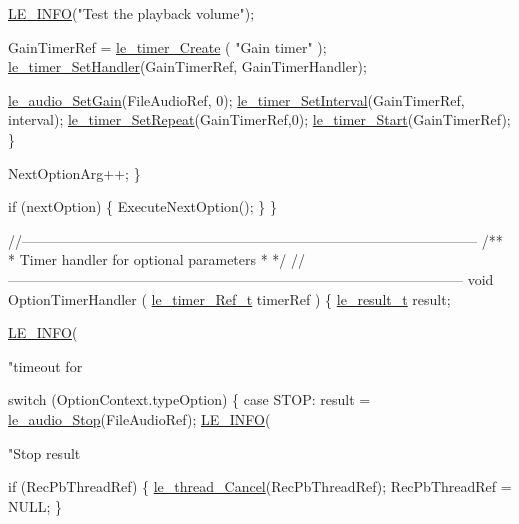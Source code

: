 \begin{DoxyCodeInclude}
{{{{{{{{{{{{{{{            \hyperlink{le__log_8h_a23e6d206faa64f612045d688cdde5808}{LE\_INFO}(\textcolor{stringliteral}{"Test the playback volume"});

            GainTimerRef = \hyperlink{le__timer_8h_aee41169a210378b369f440cf99146522}{le\_timer\_Create}  ( \textcolor{stringliteral}{"Gain timer"} );
            \hyperlink{le__timer_8h_a8fb341f11e0da2692453df997613cb8e}{le\_timer\_SetHandler}(GainTimerRef, GainTimerHandler);

            \hyperlink{le__audio__interface_8h_a65f11540e6af03a3494b6b9be76ba5fc}{le\_audio\_SetGain}(FileAudioRef, 0);
            \hyperlink{le__timer_8h_a0a103d5cef5e83fc9088859d527bbd43}{le\_timer\_SetInterval}(GainTimerRef, interval);
            \hyperlink{le__timer_8h_a292b0a7d6dc0796a36a54fd04c6a7eeb}{le\_timer\_SetRepeat}(GainTimerRef,0);
            \hyperlink{le__timer_8h_ada2ce7f8cb1e76ed959e323ae94bbfc0}{le\_timer\_Start}(GainTimerRef);
        \}

        NextOptionArg++;
    \}

    \textcolor{keywordflow}{if} (nextOption)
    \{
        ExecuteNextOption();
    \}
\}

\textcolor{comment}{//--------------------------------------------------------------------------------------------------}\textcolor{comment}{}
\textcolor{comment}{/**}
\textcolor{comment}{ * Timer handler for optional parameters}
\textcolor{comment}{ *}
\textcolor{comment}{ */}
\textcolor{comment}{//--------------------------------------------------------------------------------------------------}
\textcolor{keywordtype}{void} OptionTimerHandler
(
    \hyperlink{le__timer_8h_a763fa6992488cdce3b5a820817094838}{le\_timer\_Ref\_t} timerRef
)
\{
    \hyperlink{le__basics_8h_a1cca095ed6ebab24b57a636382a6c86c}{le\_result\_t} result;

    \hyperlink{le__log_8h_a23e6d206faa64f612045d688cdde5808}{LE\_INFO}(\textcolor{stringliteral}{"timeout for %

    \textcolor{keywordflow}{switch} (OptionContext.typeOption)
    \{
        \textcolor{keywordflow}{case} STOP:
            result = \hyperlink{le__audio__interface_8h_a4aebc6e8cdc4389c375e93418823af71}{le\_audio\_Stop}(FileAudioRef);
            \hyperlink{le__log_8h_a23e6d206faa64f612045d688cdde5808}{LE\_INFO}(\textcolor{stringliteral}{"Stop result %

            \textcolor{keywordflow}{if} (RecPbThreadRef)
            \{
                \hyperlink{le__thread_8h_a0f1c1b98f354a96e6e31e55a71b58f6a}{le\_thread\_Cancel}(RecPbThreadRef);
                RecPbThreadRef = NULL;
            \}

}}}}}}}}}}}}}}}}}
\end{DoxyCodeInclude}
